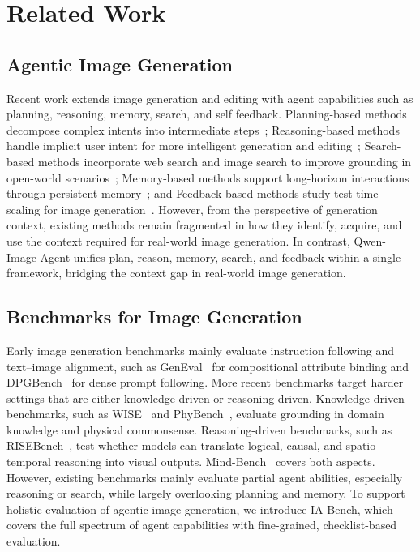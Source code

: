 \section{Related Work}

\subsection{Agentic Image Generation}

Recent work extends image generation and editing with agent capabilities such as planning, reasoning, memory, search, and self feedback. Planning-based methods decompose complex intents into intermediate steps~\citep{Yao2026PhotoAgentAP}; Reasoning-based methods handle implicit user intent for more intelligent generation and editing~\citep{He2026MindBrushIA}; Search-based methods incorporate web search and image search to improve grounding in open-world scenarios~\citep{Feng2026GenSearcherRA,He2026MindBrushIA}; Memory-based methods support long-horizon interactions through persistent memory~\citep{He2026GEMSAM}; and Feedback-based methods study test-time scaling for image generation~\citep{Jiang2026GenAgentST,Wang2025ImAgentAU}. However, from the perspective of generation context, existing methods remain fragmented in how they identify, acquire, and use the context required for real-world image generation. In contrast, Qwen-Image-Agent unifies plan, reason, memory, search, and feedback within a single framework, bridging the context gap in real-world image generation.

\subsection{Benchmarks for Image Generation}

Early image generation benchmarks mainly evaluate instruction following and text--image alignment, such as GenEval~\citep{Ghosh2023GenEvalAO} for compositional attribute binding and DPGBench~\citep{Hu2024ELLAED} for dense prompt following. More recent benchmarks target harder settings that are either knowledge-driven or reasoning-driven. Knowledge-driven benchmarks, such as WISE~\citep{Niu2025WISEAW} and PhyBench~\citep{Meng2024PhyBenchAP}, evaluate grounding in domain knowledge and physical commonsense. Reasoning-driven benchmarks, such as RISEBench~\citep{Zhao2025EnvisioningBT}, test whether models can translate logical, causal, and spatio-temporal reasoning into visual outputs. Mind-Bench~\citep{He2026MindBrushIA} covers both aspects. However, existing benchmarks mainly evaluate partial agent abilities, especially reasoning or search, while largely overlooking planning and memory. To support holistic evaluation of agentic image generation, we introduce IA-Bench, which covers the full spectrum of agent capabilities with fine-grained, checklist-based evaluation.
